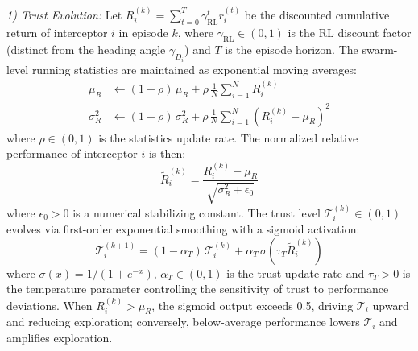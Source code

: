 \documentclass[lettersize,journal]{IEEEtran}
\begin{document}
\emph{1) Trust Evolution:} Let $R_i^{(k)} = \sum_{t=0}^{T} \gamma_{\mathrm{RL}}^t r_i^{(t)}$ be the discounted cumulative return of interceptor $i$ in episode $k$, where $\gamma_{\mathrm{RL}} \in (0,1)$ is the RL discount factor (distinct from the heading angle $\gamma_{D_i}$) and $T$ is the episode horizon. The swarm-level running statistics are maintained as exponential moving averages:
\begin{align}
\mu_R &\leftarrow (1-\rho)\,\mu_R + \rho\,\frac{1}{N}\sum_{i=1}^{N} R_i^{(k)} \label{eq:running_stats_mu} \\
\sigma_R^2 &\leftarrow (1-\rho)\,\sigma_R^2 + \rho\,\frac{1}{N}\sum_{i=1}^{N}\!\left(R_i^{(k)} - \mu_R\right)^2 \label{eq:running_stats_sigma}
\end{align}
where $\rho \in (0,1)$ is the statistics update rate. The normalized relative performance of interceptor $i$ is then:
\begin{equation}
\label{eq:trust_normalized}
\tilde{R}_i^{(k)} = \frac{R_i^{(k)} - \mu_R}{\sqrt{\sigma_R^2 + \epsilon_0}}
\end{equation}
where $\epsilon_0 > 0$ is a numerical stabilizing constant. The trust level $\mathcal{T}_i^{(k)} \in (0,1)$ evolves via first-order exponential smoothing with a sigmoid activation:
\begin{equation}
\label{eq:trust_evolution}
\mathcal{T}_i^{(k+1)} = (1-\alpha_T)\,\mathcal{T}_i^{(k)} + \alpha_T\,\sigma\!\left(\tau_T \tilde{R}_i^{(k)}\right)
\end{equation}
where $\sigma(x) = 1/(1+e^{-x})$, $\alpha_T \in (0,1)$ is the trust update rate and $\tau_T > 0$ is the temperature parameter controlling the sensitivity of trust to performance deviations. When $R_i^{(k)} > \mu_R$, the sigmoid output exceeds 0.5, driving $\mathcal{T}_i$ upward and reducing exploration; conversely, below-average performance lowers $\mathcal{T}_i$ and amplifies exploration.
\end{document}
